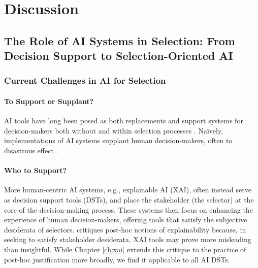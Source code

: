 \chapter{\label{ch:discussion}Discussion}

\minitoc 

\section[The Role of AI Systems in Selection]{The Role of AI Systems in Selection: From Decision Support to Selection-Oriented AI}
\subsection{Current Challenges in AI for Selection}
\subsubsection{To Support or Supplant?}
AI tools have long been posed as both replacements and support systems for decision-makers both without and within selection processes \cite{barocas_big_2016,jacobs_how_2021,hildebrandt_law_nodate,yarger2020algorithmic,mattu_how_nodate}. Naïvely, implementations of AI systems supplant human decision-makers, often to disastrous effect \cite{mattu_how_nodate}.

\subsubsection{Who to Support?}
More human-centric AI systems, e.g., explainable AI (XAI), often instead serve as decision support tools (DSTs), and place the stakeholder (the selector) at the core of the decision-making process. These systems then focus on enhancing the experience of human decision-makers, offering tools that satisfy the subjective desiderata of selectors. \textcite{Lipton} critiques post-hoc notions of explainability because, in seeking to satisfy stakeholder desiderata, XAI tools may prove more misleading than insightful. While Chapter \ref{ch:xai} extends this critique to the practice of post-hoc justification more broadly, we find it applicable to all AI DSTs.

